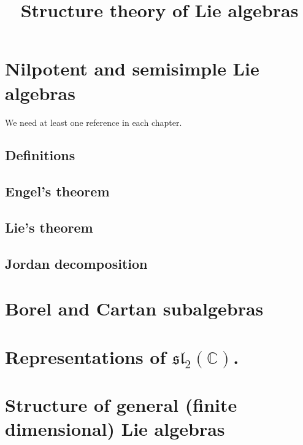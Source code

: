 

%


\title{Structure theory of Lie algebras}


\maketitle

\label{section-phantom}

\tableofcontents


\section{Nilpotent and semisimple Lie algebras}

We need at least one reference \cite{reference} in each chapter.

\subsection{Definitions}

\subsection{Engel's theorem}

\subsection{Lie's theorem}

\subsection{Jordan decomposition}

\section{Borel and Cartan subalgebras}


\section{Representations of $\mathfrak{sl}_2(\mathbb C)$.}




\section{Structure of general (finite dimensional) Lie algebras}


